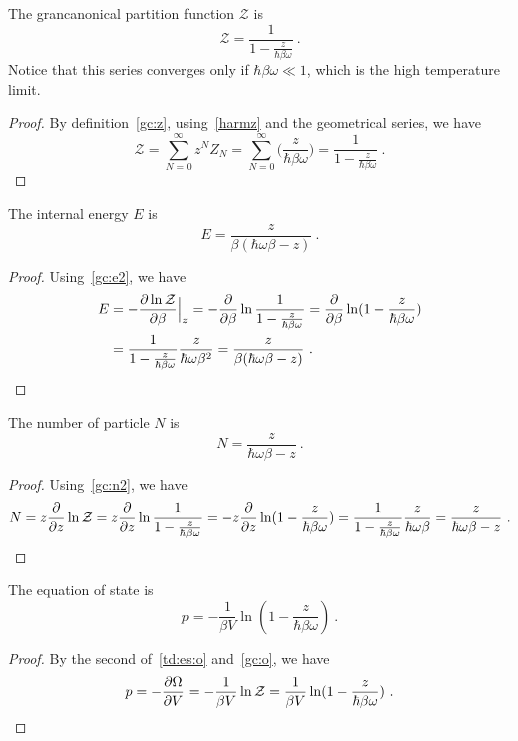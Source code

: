     The grancanonical partition function $\mathcal Z$ is 
    \begin{equation*}
        \mathcal Z = \frac{1}{1 - \frac{z}{\hbar \beta \omega}} ~.
    \end{equation*}
    Notice that this series converges only if $\hbar \beta \omega \ll 1$, which is the high temperature limit.
    \begin{proof}
        By definition~\eqref{gc:z}, using~\eqref{harmz} and the geometrical series, we have
        \begin{equation*}
            \mathcal Z = \sum_{N=0}^\infty z^N Z_N = \sum_{N=0}^\infty \Big ( \frac{z}{\hbar \beta \omega} \Big) = \frac{1}{1 - \frac{z}{\hbar \beta \omega}}  ~.
        \end{equation*}
    \end{proof}
    The internal energy $E$ is 
    \begin{equation*}
        E = \frac{z}{\beta (\hbar \omega \beta - z)} ~.
    \end{equation*}
    \begin{proof}
        Using~\eqref{gc:e2}, we have
        \begin{equation*}
        \begin{aligned}
            E & = - \frac{\partial\ln \mathcal Z}{\partial\beta} \Big \vert_z = - \frac{\partial}{\partial\beta} \ln \frac{1}{1 - \frac{z}{\hbar \beta \omega}} = \frac{\partial}{\partial\beta} \ln (1 - \frac{z}{\hbar \beta \omega} ) \\ & = \frac{1}{1 - \frac{z}{\hbar \beta \omega}} \frac{z}{\hbar \omega \beta^2} = \frac{z}{\beta (\hbar \omega \beta - z)} ~.
        \end{aligned}
        \end{equation*}
    \end{proof}
    The number of particle $N$ is 
    \begin{equation*}
        N = \frac{z}{\hbar \omega \beta - z} ~.
    \end{equation*}
    \begin{proof}
        Using~\eqref{gc:n2}, we have
        \begin{equation*}
            N = z \frac{\partial}{\partial z} \ln \mathcal Z = z \frac{\partial}{\partial z} \ln \frac{1}{1 - \frac{z}{\hbar \beta \omega}} = - z \frac{\partial}{\partial z} \ln (1 - \frac{z}{\hbar \beta \omega}) = \frac{1}{1 - \frac{z}{\hbar \beta \omega}}\frac{z}{\hbar \omega \beta} = \frac{z}{\hbar \omega \beta - z}~.
        \end{equation*}
    \end{proof}
    The equation of state is 
    \begin{equation*}
        p = - \frac{1}{\beta V}\ln (1 - \frac{z}{\hbar \beta \omega}) ~.
    \end{equation*}
    \begin{proof}
        By the second of~\eqref{td:es:o} and~\eqref{gc:o}, we have
        \begin{equation*}
            p = - \frac{\partial\Omega}{\partial V} = - \frac{1}{\beta V} \ln \mathcal Z = \frac{1}{\beta V} \ln (1 - \frac{z}{\hbar \beta \omega}) ~.
        \end{equation*}
    \end{proof}

